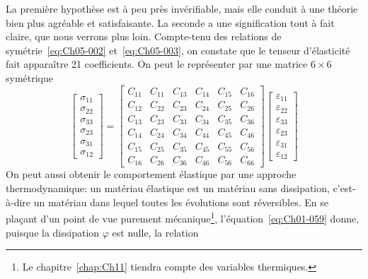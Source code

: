 La première hypothèse est à peu près invérifiable, mais elle conduit à une théorie bien plus agréable et satisfaisante.
La seconde a une signification tout à fait claire, que nous verrons plus loin.
Compte-tenu des relations de symétrie~\eqref{eq:Ch05-002} et~\eqref{eq:Ch05-003}, on constate que le tenseur d'élasticité fait apparaître 21 coefficients.
On peut le représenter par une matrice $6\times6$ symétrique
\begin{equation}
    \begin{bmatrix}
        \sigma_{11}\\
        \sigma_{22}\\
        \sigma_{33}\\
        \sigma_{23}\\
        \sigma_{31}\\
        \sigma_{12}
    \end{bmatrix}
    =
    \begin{bmatrix}
        C_{11} & C_{11} & C_{13} & C_{14} & C_{15} & C_{16} \\
        C_{12} & C_{22} & C_{23} & C_{24} & C_{25} & C_{26} \\
        C_{13} & C_{23} & C_{33} & C_{34} & C_{35} & C_{36} \\
        C_{14} & C_{24} & C_{34} & C_{44} & C_{45} & C_{46} \\
        C_{15} & C_{25} & C_{35} & C_{45} & C_{55} & C_{56} \\
        C_{16} & C_{26} & C_{36} & C_{46} & C_{56} & C_{66}
    \end{bmatrix}
    \begin{bmatrix}
        \varepsilon_{11}\\
        \varepsilon_{22}\\
        \varepsilon_{33}\\
        \varepsilon_{23}\\
        \varepsilon_{31}\\
        \varepsilon_{12}
    \end{bmatrix}
    \label{eq:Ch05-005}
\end{equation}
On peut aussi obtenir le comportement élastique par une approche thermodynamique: un matériau élastique est un matériau sans dissipation, c'est-à-dire un matériau dans lequel toutes les évolutions sont réversibles.
En se plaçant d'un point de vue purement mécanique\footnote{Le chapitre~\ref{chap:Ch11} tiendra compte des variables thermiques.}, l'équation~\eqref{eq:Ch01-059} donne, puisque la dissipation $\varphi$ est nulle, la relation
